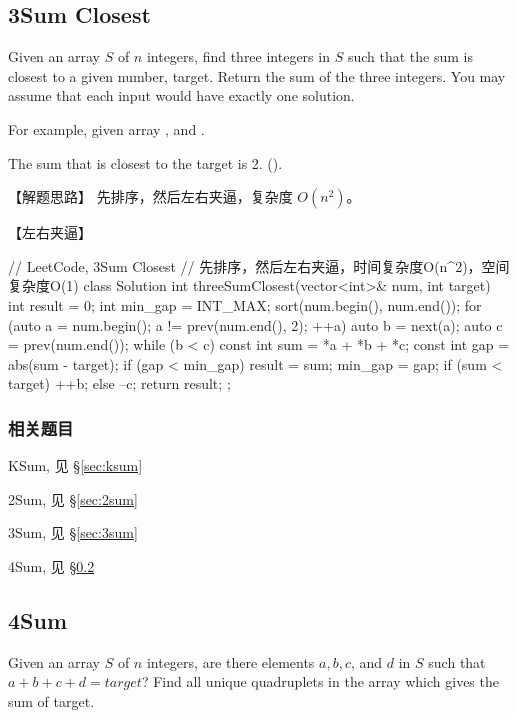 \subsection{3Sum Closest} %
\label{sec:3sum-closest}



Given an array $S$ of $n$ integers, find three integers in $S$ such that the
sum is closest to a given number, target. Return the sum of the three integers.
You may assume that each input would have exactly one solution.

For example, given array , and .

The sum that is closest to the target is 2. ().


【解题思路】
先排序，然后左右夹逼，复杂度 $O(n^2)$。


【左右夹逼】
\begin{Code}
	// LeetCode, 3Sum Closest
	// 先排序，然后左右夹逼，时间复杂度O(n^2)，空间复杂度O(1)
	class Solution {
		int threeSumClosest(vector<int>& num, int target) {
			int result = 0;
			int min_gap = INT_MAX;
			sort(num.begin(), num.end());
			for (auto a = num.begin(); a != prev(num.end(), 2); ++a) {
				auto b = next(a);
				auto c = prev(num.end());
				while (b < c) {
					const int sum = *a + *b + *c;
					const int gap = abs(sum - target);
					if (gap < min_gap) {
						result = sum;
						min_gap = gap;
					}
					if (sum < target) ++b;
					else              --c;
				}
			}
			return result;
		}
	};
\end{Code}


\subsubsection{相关题目}
\begindot
\item KSum, 见 \S \ref{sec:ksum}
\item 2Sum, 见 \S \ref{sec:2sum}
\item 3Sum, 见 \S \ref{sec:3sum}
\item 4Sum, 见 \S \ref{sec:4sum}
\myenddot


\subsection{4Sum} %
\label{sec:4sum}



Given an array $S$ of $n$ integers, are there elements $a, b, c$, and $d$ in
$S$ such that $a + b + c + d = target$? Find all unique quadruplets in the
array which gives the sum of target.

